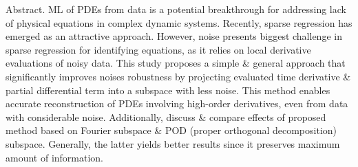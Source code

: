 \documentclass{article}
\begin{document}
{\sf Abstract.} ML of PDEs from data is a potential breakthrough for addressing lack of physical equations in complex dynamic systems. Recently, sparse regression has emerged as an attractive approach. However, noise presents biggest challenge in sparse regression for identifying equations, as it relies on local derivative evaluations of noisy data. This study proposes a simple \& general approach that significantly improves noises robustness by projecting evaluated time derivative \& partial differential term into a subspace with less noise. This method enables accurate reconstruction of PDEs involving high-order derivatives, even from data with considerable noise. Additionally, discuss \& compare effects of proposed method based on Fourier subspace \& POD (proper orthogonal decomposition) subspace. Generally, the latter yields better results since it preserves maximum amount of information.
\end{document}
